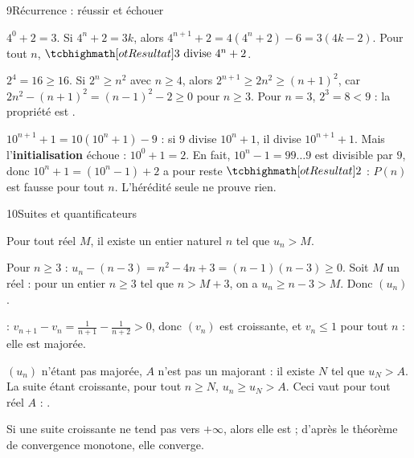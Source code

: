 \begin{deuxcolonnes}
\begin{corrige}{9}{Récurrence : réussir et échouer}
\begin{questions}
  \item {}$4^{0}+2=3$. Si $4^{n}+2=3k$, alors $4^{n+1}+2=4\left(4^{n}+2\right)-6=3(4k-2)$.
    Pour tout $n$, $\res{3\text{ divise }4^{n}+2}$.
  \item {}$2^{4}=16\geq16$. Si $2^{n}\geq n^{2}$ avec $n\geq4$, alors
    $2^{n+1}\geq2n^{2}\geq(n+1)^{2}$, car $2n^{2}-(n+1)^{2}=(n-1)^{2}-2\geq0$ pour $n\geq3$. Pour $n=3$, $2^{3}=8<9$ : la propriété est
    .
  \item $10^{n+1}+1=10\left(10^{n}+1\right)-9$ : si $9$ divise $10^{n}+1$, il divise $10^{n+1}+1$. Mais l'\textbf{initialisation} échoue :
    $10^{0}+1=2$. En fait, $10^{n}-1=99\dots9$ est divisible par $9$, donc $10^{n}+1=\left(10^{n}-1\right)+2$ a pour reste $\res{2}$ :
    $P(n)$ est fausse pour tout $n$. L'hérédité seule ne prouve rien.
\end{questions}
\end{corrige}

\end{deuxcolonnes}

\begin{corrige}{10}{Suites et quantificateurs}
\begin{questions}
  \item Pour tout réel $M$, il existe un entier naturel $n$ tel que $u_n>M$.
  \item Pour $n\geq3$ : $u_n-(n-3)=n^{2}-4n+3=(n-1)(n-3)\geq0$. Soit $M$ un réel : pour un entier $n\geq3$ tel que $n>M+3$,
    on a $u_n\geq n-3>M$. Donc $(u_n)$ .
  \item {} : $v_{n+1}-v_n=\frac{1}{n+1}-\frac{1}{n+2}>0$, donc $(v_n)$ est croissante, et $v_n\leq1$ pour tout $n$ :
    elle est majorée.
  \item $(u_n)$ n'étant pas majorée, $A$ n'est pas un majorant : il existe $N$ tel que $u_N>A$. La suite étant croissante, pour
    tout $n\geq N$, $u_n\geq u_N>A$. Ceci vaut pour tout réel $A$ : .
  \item Si une suite croissante ne tend pas vers $+\infty$, alors elle est  ; d'après le théorème de
    convergence monotone, elle converge.
\end{questions}
\end{corrige}

